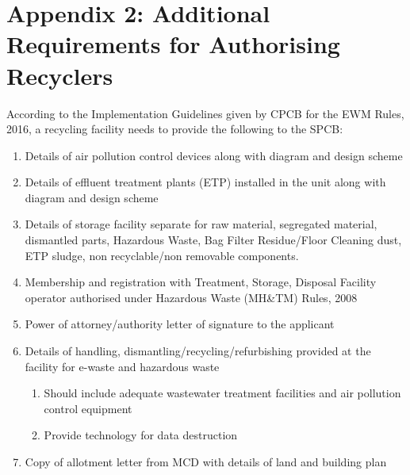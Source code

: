 \documentclass[a4paper, 12pt]{article}
\begin{document}
             
        \newpage
             \section*{Appendix 2: Additional Requirements for Authorising Recyclers}
        
        \begin{mdframed}[backgroundcolor=gray!20]
        According to the Implementation Guidelines given by CPCB for the EWM Rules, 2016, a recycling facility needs to provide the following to the SPCB:
            \begin{enumerate}
            
                       \item Details of air pollution control devices along with diagram and design scheme
                        \item Details of effluent treatment plants (ETP) installed in the unit along with diagram and design scheme 
                        \item Details of storage facility separate for raw material, segregated material, dismantled parts, Hazardous Waste, Bag Filter Residue/Floor Cleaning dust, ETP sludge, non recyclable/non removable components.
                             \item Membership and registration with Treatment, Storage, Disposal Facility operator authorised under Hazardous Waste (MH\&TM) Rules, 2008
                              \item Power of attorney/authority letter of signature to the applicant
                               \item Details of handling, dismantling/recycling/refurbishing provided at the facility for e-waste and hazardous waste 		                  
                               \begin{enumerate}
                          	 	\item Should include adequate wastewater treatment facilities and air pollution control equipment 
                    	 		 \item Provide technology for data destruction 
                      		 \end{enumerate}
                       \item Copy of allotment letter from MCD with details of land and building plan \\
            \end{enumerate}
            

\end{mdframed}
\end{document}
